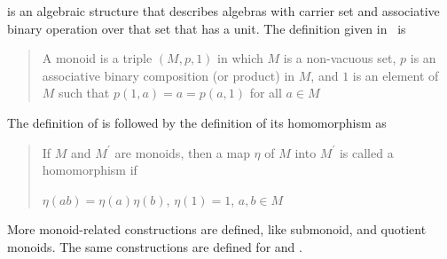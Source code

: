  is an algebraic structure that describes algebras with carrier set and associative binary operation over that set that has a unit. The definition given in~\cite{jacobson1985basic}  is 
\begin{quote}
    A monoid is a triple $(M,p,1)$ in which $M$ is a non-vacuous set, $p$ is an associative binary composition (or product) in $M$, and $1$ is an element of $M$ such that $p(1,a)= a = p(a,1)$ for all $a \in M$ 
\end{quote}
The definition of  is followed by the definition of its homomorphism as
\begin{quote}
If $M$ and $M^\prime$ are monoids, then a map $\eta$ of $M$ into $M^\prime$ is called a homomorphism if 
\begin{multicols}{3}
    $\eta(ab)=\eta(a)\eta(b)$, \vfill   
    \columnbreak
    $\eta(1) = 1$, \vfill   
    \columnbreak 
    $a,b \in M$  \vfill    
\end{multicols}
\end{quote}
More monoid-related constructions are defined, like submonoid, and quotient monoids. The same constructions are defined for  and . 

